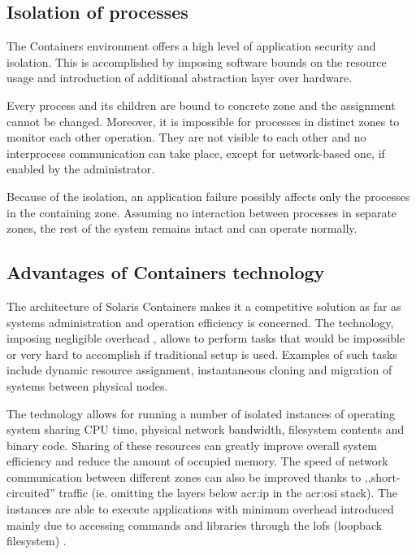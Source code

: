 \documentclass[11pt,openany]{book}
\begin{document}
      \subsection{Isolation of processes}
      \label{sub:}

        The Containers environment offers a high level of application security and isolation. This is accomplished by
        imposing software bounds on the resource usage and introduction of additional abstraction layer over hardware.

        Every process and its children are bound to concrete zone and the assignment cannot be changed. Moreover, it is
        impossible for processes in distinct zones to monitor each other operation. They are not visible to each other
        and no interprocess communication can take place, except for network-based one, if enabled by the administrator.

        Because of the isolation, an application failure possibly affects only the processes in the containing zone.
        Assuming no interaction between processes in separate zones, the rest of the system remains intact and can
        operate normally.
      

      \subsection{Advantages of Containers technology}
      \label{sub:}

        The architecture of Solaris Containers makes it a competitive solution as far as systems administration and
        operation efficiency is concerned. The technology, imposing negligible overhead \cite{price}, allows to perform
        tasks that would be impossible or very hard to accomplish if traditional setup is used. Examples of such tasks
        include dynamic resource assignment, instantaneous cloning and migration of systems between physical nodes.

        The technology allows for running a number of isolated instances of operating system sharing CPU time, physical
        network bandwidth, filesystem contents and binary code. Sharing of these resources can greatly improve overall
        system efficiency and reduce the amount of occupied memory. The speed of network communication between different
        zones can also be improved thanks to ,,short-circuited'' traffic (ie. omitting the layers below \gls{acr:ip} in
        the \gls{acr:osi} stack). The instances are able to execute applications with minimum overhead introduced mainly
        due to accessing commands and libraries through the lofs (loopback filesystem) \cite{price,fsag}.
\end{document}
